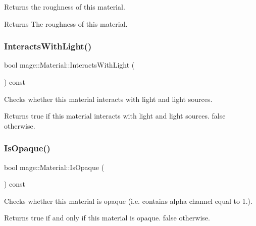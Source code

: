 Returns the roughness of this material.

\begin{DoxyReturn}{Returns}
The roughness of this material. 
\end{DoxyReturn}
\hypertarget{classmage_1_1_material_a9bb48fe0f9f8d2c21073bdf650957bd6}{}\label{classmage_1_1_material_a9bb48fe0f9f8d2c21073bdf650957bd6} 
\subsubsection{\texorpdfstring{Interacts\+With\+Light()}{InteractsWithLight()}}
{\footnotesize\ttfamily bool mage\+::\+Material\+::\+Interacts\+With\+Light (\begin{DoxyParamCaption}{ }\end{DoxyParamCaption}) const\hspace{0.3cm}{\ttfamily [noexcept]}}

Checks whether this material interacts with light and light sources.

\begin{DoxyReturn}{Returns}
{\ttfamily true} if this material interacts with light and light sources. {\ttfamily false} otherwise. 
\end{DoxyReturn}
\hypertarget{classmage_1_1_material_a0df1804c29bfd9d2bbc606d6285dccec}{}\label{classmage_1_1_material_a0df1804c29bfd9d2bbc606d6285dccec} 
\subsubsection{\texorpdfstring{Is\+Opaque()}{IsOpaque()}}
{\footnotesize\ttfamily bool mage\+::\+Material\+::\+Is\+Opaque (\begin{DoxyParamCaption}{ }\end{DoxyParamCaption}) const\hspace{0.3cm}{\ttfamily [noexcept]}}

Checks whether this material is opaque (i.\+e. contains alpha channel equal to 1.).

\begin{DoxyReturn}{Returns}
{\ttfamily true} if and only if this material is opaque. {\ttfamily false} otherwise. 
\end{DoxyReturn}
\hypertarget{classmage_1_1_material_a6a62e3889887e77259070e1f9cd9150f}{}\label{classmage_1_1_material_a6a62e3889887e77259070e1f9cd9150f} 
